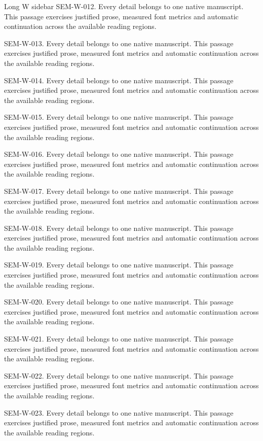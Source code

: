 \begin{m20sidebarwide}[columns=1,id=long-wide1]{Long W sidebar}
SEM-W-012. Every detail belongs to one native manuscript. This passage exercises justified prose, measured font metrics and automatic continuation across the available reading regions.\par
SEM-W-013. Every detail belongs to one native manuscript. This passage exercises justified prose, measured font metrics and automatic continuation across the available reading regions.\par
SEM-W-014. Every detail belongs to one native manuscript. This passage exercises justified prose, measured font metrics and automatic continuation across the available reading regions.\par
SEM-W-015. Every detail belongs to one native manuscript. This passage exercises justified prose, measured font metrics and automatic continuation across the available reading regions.\par
SEM-W-016. Every detail belongs to one native manuscript. This passage exercises justified prose, measured font metrics and automatic continuation across the available reading regions.\par
SEM-W-017. Every detail belongs to one native manuscript. This passage exercises justified prose, measured font metrics and automatic continuation across the available reading regions.\par
SEM-W-018. Every detail belongs to one native manuscript. This passage exercises justified prose, measured font metrics and automatic continuation across the available reading regions.\par
SEM-W-019. Every detail belongs to one native manuscript. This passage exercises justified prose, measured font metrics and automatic continuation across the available reading regions.\par
SEM-W-020. Every detail belongs to one native manuscript. This passage exercises justified prose, measured font metrics and automatic continuation across the available reading regions.\par
SEM-W-021. Every detail belongs to one native manuscript. This passage exercises justified prose, measured font metrics and automatic continuation across the available reading regions.\par
SEM-W-022. Every detail belongs to one native manuscript. This passage exercises justified prose, measured font metrics and automatic continuation across the available reading regions.\par
SEM-W-023. Every detail belongs to one native manuscript. This passage exercises justified prose, measured font metrics and automatic continuation across the available reading regions.\par

\end{m20sidebarwide}
